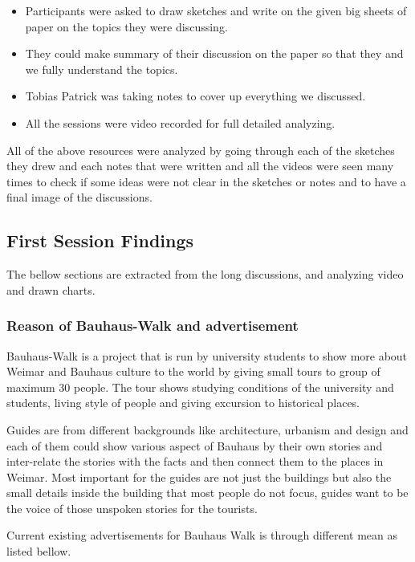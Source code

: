 \begin {itemize}
\item	Participants were asked to draw sketches and write on the given big sheets of paper on the topics they were discussing.
\item	They could make summary of their discussion on the paper so that they and we fully understand the topics.
\item	Tobias Patrick was taking notes to cover up everything we discussed.
\item	All the sessions were video recorded for full detailed analyzing. 
\end{itemize}

All of the above resources were analyzed by going through each of the sketches they drew and each notes that were written and all the videos were seen many times to check if some ideas were not clear in the sketches or notes and to have a final image of the discussions.



\subsection {First Session Findings}
The bellow sections are extracted from the long discussions, and analyzing video and drawn charts.


\subsubsection{Reason of Bauhaus-Walk and advertisement}
Bauhaus-Walk is a project that is run by university students to show more about Weimar and Bauhaus culture to the world by giving small tours to group of maximum 30 people. The tour shows studying conditions of the university and students, living style of people and giving excursion to historical places.

Guides are from different backgrounds like architecture, urbanism and design and each of them could show various aspect of Bauhaus by their own stories and inter-relate the stories with the facts and then connect them to the places in Weimar. Most important for the guides are not just the buildings but also the small details inside the building that most people do not focus, guides want to be the voice of those unspoken stories for the tourists.

Current existing advertisements for Bauhaus Walk is through different mean as listed bellow.

